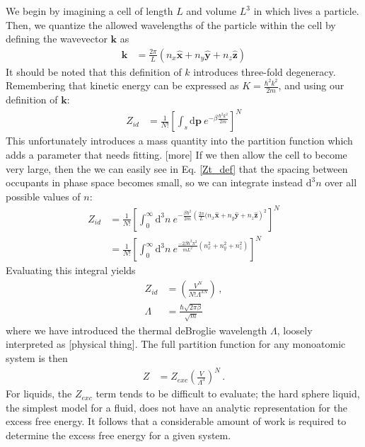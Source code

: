 \documentclass[12pt]{article}
\newcommand*{\diff}{\mathrm{d}}
\begin{document}
We begin by imagining a cell of length $L$ and volume $L^3$ in which lives a particle. Then, we quantize the allowed wavelengths of the particle within the cell by defining the wavevector $\mathbf{k}$ as
\begin{align}
    \mathbf{k} &= \frac{2\pi}{L}(n_x\mathbf{\hat{x}} + n_y\mathbf{\hat{y}} + n_z\mathbf{\hat{z}})
\end{align}
It should be noted that this definition of $k$ introduces three-fold degeneracy.\\
Remembering that kinetic energy can be expressed as $K = \frac{\hbar^2 k^2}{2m}$, and using our definition of $\mathbf{k}$:
\begin{align}
    Z_{id} &= \frac{1}{N!}\left[\int_s \diff\mathbf{p} ~e^{-\beta \frac{\hbar^2 k^2}{2m}}\right]^{N}
    \label{Zt_def}
\end{align}
This unfortunately introduces a mass quantity into the partition function which adds a parameter that needs fitting. [more] 
If we then allow the cell to become very large, then the we can easily see in Eq. \ref{Zt_def} that the spacing between occupants in phase space becomes small, so we can integrate instead $\diff ^3 n$ over all possible values of $n$:
\begin{align}
    Z_{id} &= \frac{1}{N!}\left[\int_0^\infty \diff^3 n ~e^{-\frac{\beta \hbar^2}{2m} \left(\frac{2\pi}{L}(n_x\mathbf{\hat{x}} + n_y\mathbf{\hat{y}} + n_z\mathbf{\hat{z}}\right)^2}\right]^{N} \\
    &= \frac{1}{N!}\left[\int_0^\infty \diff^3 n ~e^{ \frac{-2\beta \hbar^2\pi^2}{mL^2}(n_x^2 + n_y^2 + n_z^2)}\right]^{N}
\end{align}
Evaluating this integral yields
\begin{align}
    Z_{id} &= \left(\frac{V^N}{N!\Lambda^{3N}}\right) \,, \\
    \Lambda &= \frac{\hbar\sqrt{2\pi\beta}}{\sqrt{m}}
\end{align}
where we have introduced the thermal deBroglie wavelength $\Lambda$, loosely interpreted as [physical thing]. The full partition function for any monoatomic system is then
\begin{align}
    Z &= Z_{exc} \left(\frac{V}{\Lambda^{3}}\right)^{N} \,.
\end{align}
For liquids, the $Z_{exc}$ term tends to be difficult to evaluate; the hard sphere liquid, the simplest model for a fluid, does not have an analytic representation for the excess free energy. It follows that a considerable amount of work is required to determine the excess free energy for a given system. 
\end{document}
